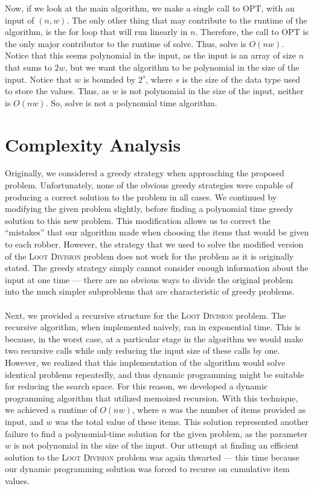 \documentclass{article}
\begin{document}
Now, if we look at the main algorithm, we make a single call to OPT, with an input of $(n,w)$.  The only other thing that may contribute to the runtime of the algorithm, is the for loop that will run linearly in $n$.  Therefore, the call to OPT is the only major contributor to the runtime of solve.  Thus, solve is $O(nw)$.  Notice that this seems polynomial in the input, as the input is an array of size $n$ that sums to $2w$, but we want the algorithm to be polynomial in the size of the input.  Notice that $w$ is bounded by $2^s$, where $s$ is the size of the data type used to store the values.  Thus, as $w$ is not polynomial in the size of the input, neither is $O(nw)$.  So, solve is not a polynomial time algorithm.

\section{Complexity Analysis}

Originally, we considered a greedy strategy when approaching the proposed problem. Unfortunately, none of the obvious greedy strategies were capable of producing a correct solution to the problem in all cases. We continued by modifying the given problem slightly, before finding a polynomial time greedy solution to this new problem. This modification allows us to correct the ``mistakes'' that our algorithm made when choosing the items that would be given to each robber. However, the strategy that we used to solve the modified version of the \textsc{Loot Division} problem does not work for the problem as it is originally stated. The greedy strategy simply cannot consider enough information about the input at one time --- there are no obvious ways to divide the original problem into the much simpler subproblems that are characteristic of greedy problems. \\ \\
Next, we provided a recursive structure for the \textsc{Loot Division} problem. The recursive algorithm, when implemented naively, ran in exponential time. This is because, in the worst case, at a particular stage in the algorithm we would make two recursive calls while only reducing the input size of these calls by one. However, we realized that this implementation of the algorithm would solve identical problems repeatedly, and thus dynamic programming might be suitable for reducing the search space. For this reason, we developed a dynamic programming algorithm that utilized memoized recursion. With this technique, we achieved a runtime of $O(nw)$, where $n$ was the number of items provided as input, and $w$ was the total value of these items. This solution represented another failure to find a polynomial-time solution for the given problem, as the parameter $w$ is not polynomial in the size of the input. Our attempt at finding an efficient solution to the \textsc{Loot Division} problem was again thwarted --- this time because our dynamic programming solution was forced to recurse on cumulative item values. \\ \\
\end{document}
